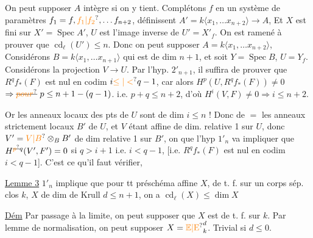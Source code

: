  On peut supposer $A$
intègre si on y tient. Complétons
$f$ en un système de paramètres
$f_1=f,\unsure{f_1|f_2},\ldots f_{n+2}$, 
 définissent 
$A'=k\langle x_1,\ldots x_{n+2}\rangle\to A$, Et $X$ 
est fini sur $X'=\operatorname{Spec} A'$, $U$ est l'image
inverse de $U'=X'_f$. On est
ramené à prouver que $\operatorname{cd}_{\ell}(U')\leq n$. Donc on
peut supposer $A=k\langle x_1,\ldots x_{n+2}\rangle$,  Considérons
$B=k\langle x_1,\ldots x_{n+1}\rangle$ qui est de dim $n+1$, et
soit $Y=\operatorname{Spec} B$, $U=Y_f$. Considérons la projection
$V\longrightarrow U$. Par l'hyp.  $2'_{n+1}$, il suffira de
prouver que  $R^qf_*(F)$ est nul en
codim $i\unsure{\leq|<}q-1$, car alors $H^p(U,R^qf_*(F))\ne0$
$\Rightarrow\deleted{\unsure{pour}}\ p\leq n+1-(q-1)$. i.e. $p+q\leq n+2$,
d'où $H^i(V,F)\ne0\Rightarrow i\leq n+2$.

Or les anneaux locaux des pts de $U$ sont
de dim \uline{$i\leq n$} ! Donc de $=$ les anneaux
strictement locaux $B'$ de $U$, et  $V$ étant
affine de dim. relative 1 sur $U$, donc
$V'=\unsure{V|B}\otimes_B B'$  de dim relative 1 sur $B'$, on
 que l'hyp $1'_n$ va impliquer
que $H^{\deleted{\unsure{p}}q}(V',F')=0$ si $q>i+1$ i.e. \uline{$i<q-1$},
[i.e. $R^qf_*(F)$ est nul en codim $i<q-1$].
C'est ce qu'il faut vérifier,  

\uline{Lemme 3} $1'_n$  
implique que
pour tt préschéma affine $X$,  de
t. f. sur un corps sép. clos $k$, $X$ de
dim de Krull $d\leq n+1$, on a $\operatorname{cd}_{\ell}(X)\leq\dim X$

\uline{Dém} Par passage à la limite, on peut supposer
que $X$ est de t. f. sur $k$.  
 Par lemme
de normalisation, on peut supposer $X={\unsure{\mathbb E|\mathrm E}}^d_k$.
 Trivial si $d\leq0$.

